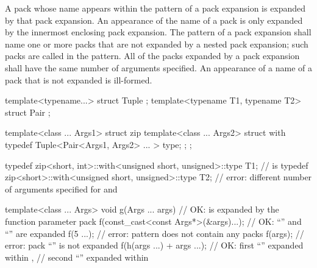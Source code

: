 \pnum
A pack whose name appears within the pattern of a pack
expansion is expanded by that pack expansion. An appearance of the name of
a pack is only expanded by the innermost enclosing pack expansion.
The pattern of a pack expansion shall name one or more packs that
are not expanded by a nested pack expansion; such packs are called
 in the pattern. All of the packs expanded
by a pack expansion shall have the same number of arguments specified. An
appearance of a name of a pack that is not expanded is
ill-formed.
\begin{example}
\begin{codeblock}
template<typename...> struct Tuple {};
template<typename T1, typename T2> struct Pair {};

template<class ... Args1> struct zip {
  template<class ... Args2> struct with {
    typedef Tuple<Pair<Args1, Args2> ... > type;
  };
};

typedef zip<short, int>::with<unsigned short, unsigned>::type T1;
    //  is 
typedef zip<short>::with<unsigned short, unsigned>::type T2;
    // error: different number of arguments specified for  and 

template<class ... Args>
  void g(Args ... args) {                   // OK:  is expanded by the function parameter pack 
    f(const_cast<const Args*>(&args)...);   // OK: ``'' and ``'' are expanded
    f(5 ...);                               // error: pattern does not contain any packs
    f(args);                                // error: pack ``'' is not expanded
    f(h(args ...) + args ...);              // OK: first ``'' expanded within ,
                                            // second ``'' expanded within 
  }
\end{codeblock}
\end{example}

